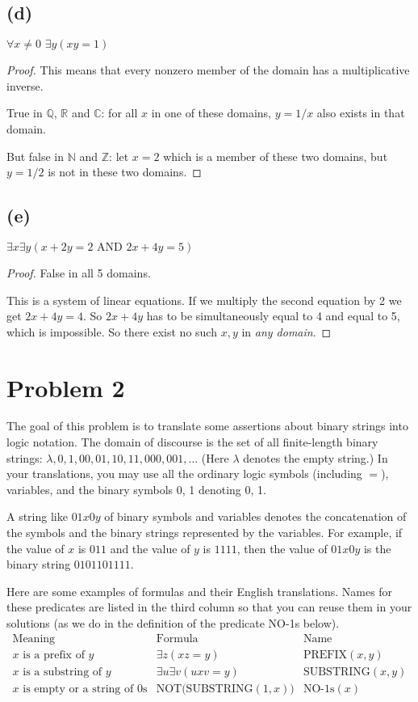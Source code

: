 \documentclass[14pt]{extarticle}
\begin{document}
\subsection{(d)}
$\forall x \neq 0 \,\,\exists y (xy = 1) $
\begin{proof}
This means that every nonzero member of the domain has a multiplicative inverse. 

True in $\mathbb{Q}$, $\mathbb{R}$ and $\mathbb{C}$: for all $x$ in one of these domains, $y = 1/x$ also exists in that domain. 

But false in $\mathbb{N}$ and $\mathbb{Z}$: let $x = 2$ which is a member of these two domains, but $y = 1/2$ is not in these two domains.
\end{proof}

\subsection{(e)}
$\exists x \exists y (x + 2y = 2 \text{ AND } 2x + 4y = 5)$
\begin{proof}
False in all 5 domains.

This is a system of linear equations. If we multiply the second equation by 2 we get $2x + 4y = 4$. So $2x + 4y$ has to be simultaneously equal to 4 and equal to 5, which is impossible. So there exist no such $x, y$ in {\it any domain}.
\end{proof}

\section{Problem 2}
The goal of this problem is to translate some assertions about binary strings into logic notation. The domain of discourse is the set of all finite-length binary strings: $\lambda, 0, 1, 00, 01, 10, 11, 000, 001, \ldots$ (Here $\lambda$ denotes the empty string.) In your translations, you may use all the ordinary logic symbols (including $=$), variables, and the binary symbols 0, 1 denoting 0, 1.

A string like $01x0y$ of binary symbols and variables denotes the concatenation of the symbols and the binary strings represented by the variables. For example, if the value of $x$ is $011$ and the value of $y$ is $1111$, then the value of $01x0y$ is the binary string $0101101111$.

Here are some examples of formulas and their English translations. Names for these predicates are listed in the third column so that you can reuse them in your solutions (as we do in the definition of the predicate NO-1s below).
$$
\begin{array}{|l|c|l|}
\text{Meaning} & \text{Formula} & \text{Name}\\
\hline
x \text{ is a prefix of } y & \exists z(xz = y) & \text{PREFIX}(x, y)\\
x \text{ is a substring of } y & \exists u \exists v(uxv = y) & \text{SUBSTRING}(x, y)\\
x \text{ is empty or a string of } 0 \text{s} & \text{NOT(SUBSTRING}(1,x)) & \text{NO-1s}(x)
\end{array}
$$
\end{document}
